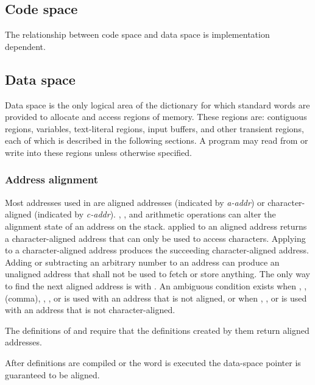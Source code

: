 \subsection{Code space} %

The relationship between code space and data space is implementation
dependent.

\subsection{Data space} %
\label{usage:dataspace}

Data space is the only logical area of the dictionary for which
standard words are provided to allocate and access regions of
memory. These regions are: contiguous regions, variables,
text-literal regions, input buffers, and other transient regions,
each of which is described in the following sections. A program may
read from or write into these regions unless otherwise specified.

\subsubsection{Address alignment} %
\label{usage:aaddr}

Most addresses used in  are aligned addresses (indicated
by \emph{a-addr}) or character-aligned (indicated by \emph{c-addr}).
, , and arithmetic operations can alter
the alignment state of an address on the stack.  applied
to an aligned address returns a character-aligned address that can
only be used to access characters. Applying  to a
character-aligned address produces the succeeding character-aligned
address. Adding or subtracting an arbitrary number to an address can
produce an unaligned address that shall not be used to fetch or
store anything. The only way to find the next aligned address is
with . An ambiguous condition exists when
, \word{!}, \word{,} (comma), \word{+!}, , or
 is used with an address that is not aligned, or when
, , or  is used with an address that is
not character-aligned.

The definitions of  and
 require that the definitions created
by them return aligned addresses.

After definitions are compiled or the word  is executed
the data-space pointer is guaranteed to be aligned.

